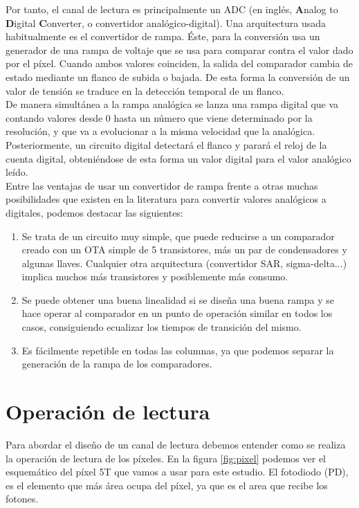 Por tanto, el canal de lectura es principalmente un ADC (en inglés, \textbf{A}nalog
to \textbf{D}igital \textbf{C}onverter, o convertidor analógico-digital).
Una arquitectura usada habitualmente es el convertidor de rampa.
Éste, para la conversión usa un generador de una rampa de voltaje que se usa para
comparar contra el valor dado por el píxel. Cuando ambos valores coinciden,
la salida del comparador cambia de estado mediante un flanco de subida o bajada.
De esta forma la conversión de un valor de tensión se traduce en la detección temporal
de un flanco.\\

De manera simultánea a la rampa analógica se lanza una rampa digital que va contando
valores desde 0 hasta un número que viene determinado por la resolución, y que va a
evolucionar a la misma velocidad que la analógica. Posteriormente, un circuito digital
detectará el flanco y parará el reloj de la cuenta digital, obteniéndose de esta forma
un valor digital para el valor analógico leído.\\

Entre las ventajas de usar un convertidor de rampa frente a otras muchas posibilidades
que existen en la literatura para convertir valores analógicos a digitales, podemos
destacar las siguientes:\\

\begin{enumerate}
	\item Se trata de un circuito muy simple, que puede reducirse a un comparador
	creado con un OTA simple de 5 transistores, más un par de condensadores y
	algunas llaves. Cualquier otra arquitectura (convertidor SAR, sigma-delta...)
	implica muchos más transistores y posiblemente más consumo.
	\item Se puede obtener una buena linealidad si se diseña una buena rampa
	y se hace operar al comparador en un punto de operación similar en todos los casos,
	consiguiendo ecualizar los tiempos de transición del mismo.
	\item Es fácilmente repetible en todas las columnas, ya que podemos separar
	la generación de la rampa de los comparadores.
\end{enumerate}

\section{Operación de lectura}\label{cap:ro_sch_operacion}

Para abordar el diseño de un canal de lectura debemos entender como se realiza la
operación de lectura de los píxeles.
En la figura \ref{fig:pixel} podemos ver el esquemático del píxel 5T
que vamos a usar para este estudio. El fotodiodo (PD), es el elemento que más
área ocupa del píxel, ya que es el area que recibe los fotones.

